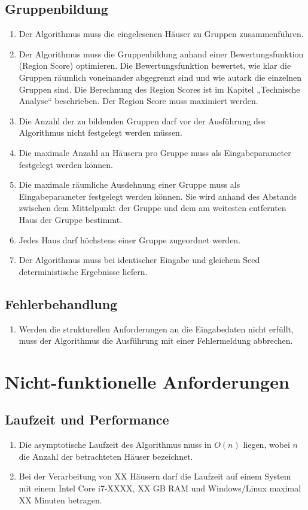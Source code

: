 \subsection{Gruppenbildung}
\begin{enumerate}[label=Req-F-\arabic*:]
    \item Der Algorithmus muss die eingelesenen Häuser zu Gruppen zusammenführen.
    \item Der Algorithmus muss die Gruppenbildung anhand einer Bewertungsfunktion (Region Score) optimieren. Die Bewertungsfunktion bewertet, wie klar die Gruppen räumlich voneinander abgegrenzt sind und wie autark die einzelnen Gruppen sind. Die Berechnung des Region Scores ist im Kapitel „Technische Analyse“ beschrieben. Der Region Score muss maximiert werden.
    \item Die Anzahl der zu bildenden Gruppen darf vor der Ausführung des Algorithmus nicht festgelegt werden müssen.
    \item Die maximale Anzahl an Häusern pro Gruppe muss als Eingabeparameter festgelegt werden können.
    \item Die maximale räumliche Ausdehnung einer Gruppe muss als Eingabeparameter festgelegt werden können. Sie wird anhand des Abstands zwischen dem Mittelpunkt der Gruppe und dem am weitesten entfernten Haus der Gruppe bestimmt.
    \item Jedes Haus darf höchstens einer Gruppe zugeordnet werden.
    \item Der Algorithmus muss bei identischer Eingabe und gleichem Seed deterministische Ergebnisse liefern.
\end{enumerate}

\subsection{Fehlerbehandlung}
\begin{enumerate}[label=Req-R-\arabic*:]
    \item Werden die strukturellen Anforderungen an die Eingabedaten nicht erfüllt, muss der Algorithmus die Ausführung mit einer Fehlermeldung abbrechen.
\end{enumerate}


\section{Nicht-funktionelle Anforderungen}

\subsection{Laufzeit und Performance}
\begin{enumerate}[label=Req-Q-\arabic*:]
    \item Die asymptotische Laufzeit des Algorithmus muss in $O(n)$ liegen, wobei $n$ die Anzahl der betrachteten Häuser bezeichnet.
    \item Bei der Verarbeitung von XX Häusern darf die Laufzeit auf einem System mit einem Intel Core i7-XXXX, XX GB RAM und Windows/Linux maximal XX Minuten betragen.
\end{enumerate}
